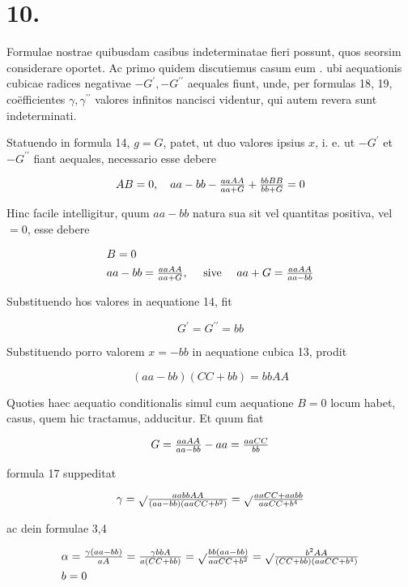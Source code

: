 \documentclass[twoside,12pt, showframe]{memoir}
\let\oldfrac\frac
\def\frac#1#2{\mathchoice{\tfrac{#1}{#2}}{\oldfrac{#1}{#2}}{\genfrac{}{}{}{2}{#1}{#2\mathstrut}}{\genfrac{}{}{}{3}{#1}{#2\mathstrut}}}
\begin{document}
\section*{10.}
Formulae nostrae quibusdam casibus indeterminatae fieri possunt, quos seorsim considerare oportet. Ac primo quidem discutiemus casum eum . ubi aequationis cubicae radices negativae \(-G^{\prime},-G^{\prime \prime}\) aequales fiunt, unde, per formulas 18, 19, coëfficientes \(\gamma, \gamma^{\prime \prime}\) valores infinitos nancisci videntur, qui autem revera sunt indeterminati.

Statuendo in formula 14, \(g=G\), patet, ut duo valores ipsius \(x\), i. e. ut \(-G^{\prime}\) et \(-G^{\prime \prime}\) fiant aequales, necessario esse debere

\[
A B=0, \quad a a-b b-\frac{a a A A}{a a+G}+\frac{b b B B}{b b+G}=0
\]

Hinc facile intelligitur, quum \(a a-b b\) natura sua sit vel quantitas positiva, vel \(=0\), esse debere

\[
\begin{aligned}
& B=0 \\
& a a-b b=\frac{a a A A}{a a+G}, \quad \text { sive } \quad a a+G=\frac{a a A A}{a a-b b}
\end{aligned}
\]

Substituendo hos valores in aequatione 14, fit

\[
G^{\prime}=G^{\prime \prime}=b b
\]

Substituendo porro valorem \(x=-b b\) in aequatione cubica 13, prodit

\[
(a a-b b)(C C+b b)=b b A A
\]

Quoties haec aequatio conditionalis simul cum aequatione \(B=0\) locum habet, casus, quem hic tractamus, adducitur. Et quum fiat

\[
G=\frac{a a A A}{a a-b b}-a a=\frac{a a C C}{b b}
\]

formula 17 suppeditat

\[
\gamma=\sqrt{ } \frac{a a b b A A}{(a a-b b)\left(a a C C+b^{2}\right)}=\sqrt{ } \frac{a a C C+a a b b}{a a C C+b^{4}}
\]

ac dein formulae 3,4

\[
\begin{aligned}
& \alpha=\frac{\gamma(a a-b b)}{a A}=\frac{\gamma b b A}{a(C C+b b)}=\sqrt{ } \frac{b b(a a-b b)}{a a C C+b^{2}}=\sqrt{ } \frac{b^{2} A A}{(C C+b b)\left(a a C C+b^{4}\right)} \\
& b=0
\end{aligned}
\]
\end{document}
